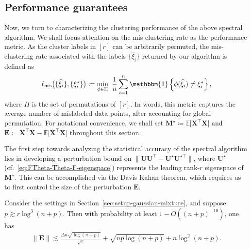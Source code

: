 \subsection{Performance guarantees}
\label{sec:theory-gaussian-mixture}


Now, we turn to characterizing the clustering performance of the above spectral algorithm.
We shall focus attention on the mis-clustering rate as the performance metric.  As the cluster labels in $[r]$ can be arbitrarily permuted,
the mis-clustering rate associated with the labels $\{\widehat{\xi}_{i}\}$ returned by our algorithm is defined as
%
\[
	\ell_{\mathsf{mis}}\big(\{\widehat{\xi}_{i}\},\{\xi_{i}^{\star}\}\big)
	\coloneqq \min_{\phi\in\Pi} ~ \frac{1}{n}\sum_{i=1}^{n}\mathbbm{1}\left\{ \phi(\widehat{\xi}_{i})\neq\xi_{i}^{\star}\right\} ,
\]
%
where $\Pi$ is the set of permutations of $[r]$.
In words, this metric captures the average number of mislabeled data points, after accounting for global permutation.
For notational convenience, we shall set $\bm{M}^{\star}\coloneqq\mathbb{E}\big[\bm{X}^{\top}\bm{X}\big]$ and
$\bm{E}\coloneqq\bm{X}^{\top}\bm{X} - \mathbb{E}\big[\bm{X}^{\top}\bm{X}\big]$ throughout this section.


The first step towards analyzing the statistical accuracy of the spectral algorithm lies in developing a perturbation bound on $\|\bm{U}\bm{U}^{\top} - \bm{U}^{\star}\bm{U}^{\star\top}\|$, where $\bm{U}^{\star}$ (cf.~\eqref{eq:FTheta-Theta-F-eigenspace}) represents the leading rank-$r$ eigenspace of $\bm{M}^{\star}$.
This can be accomplished via the Davis-Kahan theorem, which requires us to first control the size of the perturbation $\bm{E}$.
%
\begin{lemma}
	\label{lem:perturbation-norm-Gaussian-mixture}
	Consider the settings in Section~\ref{sec:setup-gaussian-mixture}, and suppose $p\gtrsim r \log ^3 (n+p)$.
	Then with probability at least $1-O((n+p)^{-10})$, one has
	\begin{align*}
		\|\bm{E}\|  \lesssim\frac{\Delta n\sqrt{\log(n+p)}}{\sqrt{r}}+\sqrt{np\log(n+p)}+n\log^{2}(n+p) .
	\end{align*}
\end{lemma}
%

